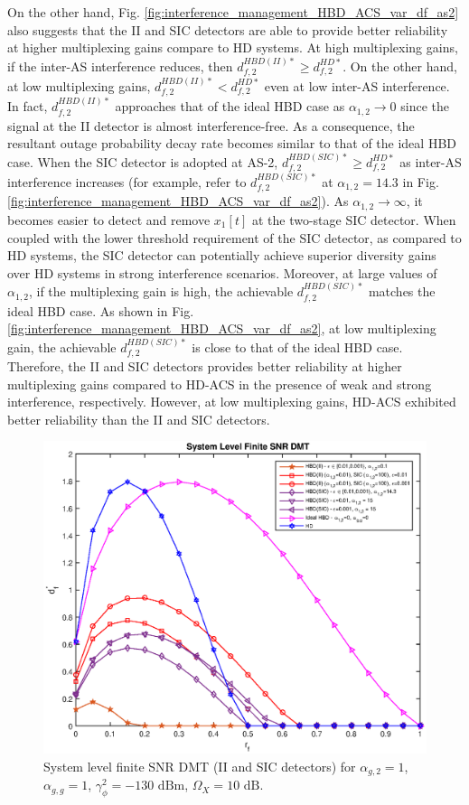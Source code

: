 On the other hand, Fig. \ref{fig:interference_management_HBD_ACS_var_df_as2} also suggests that the II and SIC detectors are able to provide better reliability at higher multiplexing gains compare to HD systems. At high multiplexing gains, if the inter-AS interference reduces, then $d_{f,2}^{HBD(II)*} \geq d_{f,2}^{HD*}$. On the other hand, at low multiplexing gains, $d_{f,2}^{HBD(II)*} < d_{f,2}^{HD*}$ even at low inter-AS interference. In fact, $d_{f,2}^{HBD(II)*}$ approaches that of the ideal HBD case as $\alpha_{1,2} \to 0$ since the signal at the II detector is almost interference-free. As a consequence, the resultant outage probability decay rate becomes similar to that of the ideal HBD case. When the SIC detector is adopted at AS-2, $d_{f,2}^{HBD(SIC)*} \geq d_{f,2}^{HD*}$ as inter-AS interference increases (for example, refer to $d_{f,2}^{HBD(SIC)*}$ at $\alpha_{1,2} = 14.3$ in Fig. \ref{fig:interference_management_HBD_ACS_var_df_as2}). As $\alpha_{1,2}\to\infty$, it becomes easier to detect and remove $x_1[t]$ at the two-stage SIC detector. When coupled with the lower threshold requirement of the SIC detector, as compared to HD systems, the SIC detector can potentially achieve superior diversity gains over HD systems in strong interference scenarios. Moreover, at large values of $\alpha_{1,2}$, if the multiplexing gain is high, the achievable $d_{f,2}^{HBD(SIC)*}$ matches the ideal HBD case. As shown in Fig. \ref{fig:interference_management_HBD_ACS_var_df_as2}, at low multiplexing gain, the achievable $d_{f,2}^{HBD(SIC)*}$ is close to that of the ideal HBD case. Therefore, the II and SIC detectors provides better reliability at higher multiplexing gains compared to HD-ACS in the presence of weak and strong interference, respectively. However, at low multiplexing gains, HD-ACS exhibited better reliability than the II and SIC detectors.

\begin{figure} []
\centering
\includegraphics [width=0.45\columnwidth]{chap3_fig/var_df_sys.eps} 
\caption{System level finite SNR DMT (II and SIC detectors) for $\alpha_{g,2}=1$, $\alpha_{g,g}=1$, $\gamma_{\phi}^2=-130 \text{ dBm}$, $\Omega_X=10 \text{ dB}$.}
\label{fig:interference_management_HBD_ACS_var_df_sys}
\end{figure}

